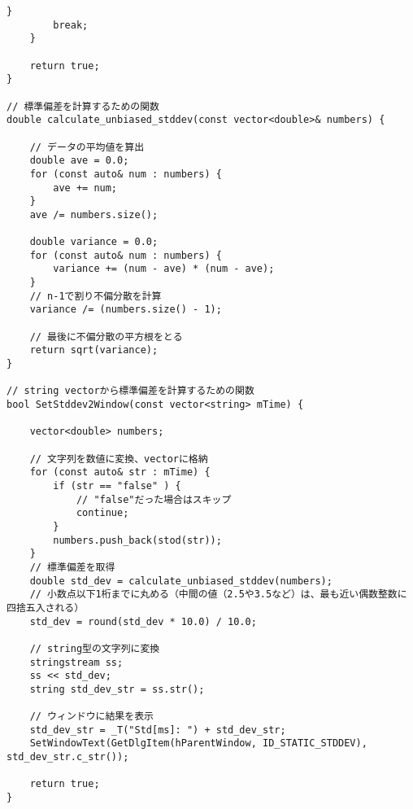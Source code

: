 \begin{lstlisting}[caption=main.cpp]
		}
		break;
	}

	return true;
}

// 標準偏差を計算するための関数
double calculate_unbiased_stddev(const vector<double>& numbers) {

	// データの平均値を算出
	double ave = 0.0;
	for (const auto& num : numbers) {
		ave += num;
	}
	ave /= numbers.size();

	double variance = 0.0;
	for (const auto& num : numbers) {
		variance += (num - ave) * (num - ave);
	}
	// n-1で割り不偏分散を計算
	variance /= (numbers.size() - 1);
	
	// 最後に不偏分散の平方根をとる
	return sqrt(variance);
}

// string vectorから標準偏差を計算するための関数
bool SetStddev2Window(const vector<string> mTime) {

	vector<double> numbers;

	// 文字列を数値に変換、vectorに格納
	for (const auto& str : mTime) {
		if (str == "false" ) {
			// "false"だった場合はスキップ
			continue;
		}
		numbers.push_back(stod(str));
	}
	// 標準偏差を取得
	double std_dev = calculate_unbiased_stddev(numbers);
	// 小数点以下1桁までに丸める（中間の値（2.5や3.5など）は、最も近い偶数整数に四捨五入される）
	std_dev = round(std_dev * 10.0) / 10.0;

	// string型の文字列に変換
	stringstream ss;
	ss << std_dev;
	string std_dev_str = ss.str();

	// ウィンドウに結果を表示
	std_dev_str = _T("Std[ms]: ") + std_dev_str;
	SetWindowText(GetDlgItem(hParentWindow, ID_STATIC_STDDEV), std_dev_str.c_str());

	return true;
}
\end{lstlisting}

